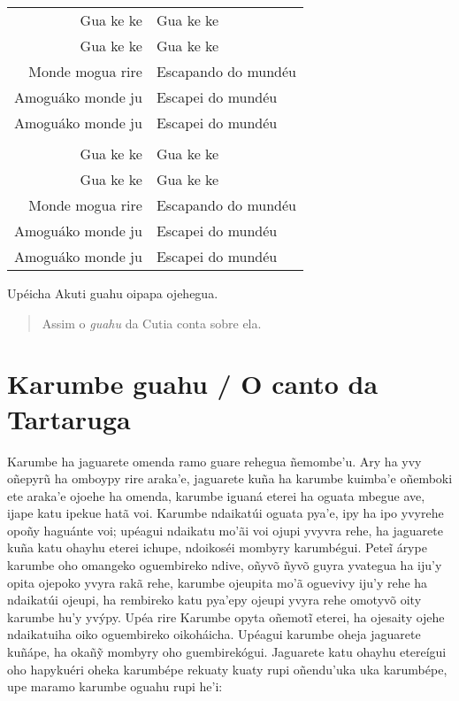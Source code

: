 \begin{table}[]
\begin{tabular}{rl}
Gua ke ke         & Gua ke ke           \\
Gua ke ke         & Gua ke ke           \\
Monde mogua rire  & Escapando do mundéu \\
Amoguáko monde ju & Escapei do mundéu   \\
Amoguáko monde ju & Escapei do mundéu   \\
                  &                     \\
Gua ke ke         & Gua ke ke           \\
Gua ke ke         & Gua ke ke           \\
Monde mogua rire  & Escapando do mundéu \\
Amoguáko monde ju & Escapei do mundéu   \\
Amoguáko monde ju & Escapei do mundéu  
\end{tabular}
\end{table}

Upéicha Akuti guahu oipapa ojehegua.

\begin{quote}
Assim o \emph{guahu} da Cutia conta sobre ela.
\end{quote}

\chapter{Karumbe guahu / O canto da Tartaruga}

Karumbe ha jaguarete omenda ramo guare rehegua ñemombe'u. Ary ha yvy
oñepyrũ ha omboypy rire araka'e, jaguarete kuña ha karumbe kuimba'e
oñemboki ete araka'e ojoehe ha omenda, karumbe iguaná eterei ha oguata
mbegue ave, ijape katu ipekue hatã voi. Karumbe ndaikatúi oguata pya'e,
ipy ha ipo yvyrehe opoñy haguánte voi; upéagui ndaikatu mo'ãi voi ojupi
yvyvra rehe, ha jaguarete kuña katu ohayhu eterei ichupe, ndoikoséi
mombyry karumbégui. Peteĩ árype karumbe oho omangeko oguembireko ndive,
oñyvõ ñyvõ guyra yvategua ha iju'y opita ojepoko yvyra rakã rehe,
karumbe ojeupita mo'ã oguevivy iju'y rehe ha ndaikatúi ojeupi, ha
rembireko katu pya'epy ojeupi yvyra rehe omotyvõ oity karumbe hu'y
yvýpy. Upéa rire Karumbe opyta oñemotĩ eterei, ha ojesaity ojehe
ndaikatuiha oiko oguembireko oikoháicha. Upéagui karumbe oheja jaguarete
kuñápe, ha okañỹ mombyry oho guembirekógui. Jaguarete katu ohayhu
etereígui oho hapykuéri oheka karumbépe rekuaty kuaty rupi oñendu'uka
uka karumbépe, upe maramo karumbe oguahu rupi he'i:

